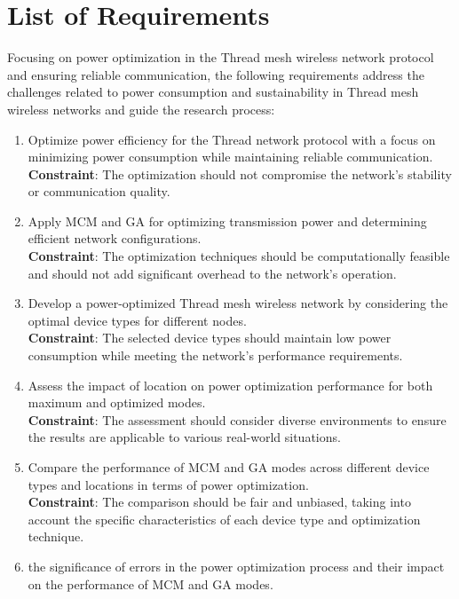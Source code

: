 \section{List of Requirements}\label{sec:list_of_requirements}
Focusing on power optimization in the Thread mesh wireless network protocol and ensuring reliable communication, the following requirements address the challenges related to power consumption and sustainability in Thread mesh wireless networks and guide the research process:

\begin{enumerate}
    \item Optimize power efficiency for the Thread network protocol with a focus on minimizing power consumption while maintaining reliable communication.\\
    \textbf{Constraint}: The optimization should not compromise the network's stability or communication quality.
    \item Apply \gls{MCM} and \gls{GA} for optimizing transmission power and determining efficient network configurations.\\
    \textbf{Constraint}: The optimization techniques should be computationally feasible and should not add significant overhead to the network's operation.
    \item Develop a power-optimized Thread mesh wireless network by considering the optimal device types for different nodes.\\
    \textbf{Constraint}: The selected device types should maintain low power consumption while meeting the network's performance requirements.
    \item Assess the impact of location on power optimization performance for both maximum and optimized modes.\\
    \textbf{Constraint}: The assessment should consider diverse environments to ensure the results are applicable to various real-world situations.
    \item Compare the performance of \gls{MCM} and \gls{GA} modes across different device types and locations in terms of power optimization.\\
    \textbf{Constraint}: The comparison should be fair and unbiased, taking into account the specific characteristics of each device type and optimization technique.
    \item the significance of errors in the power optimization process and their impact on the performance of MCM and GA modes.\\

\end{enumerate}
